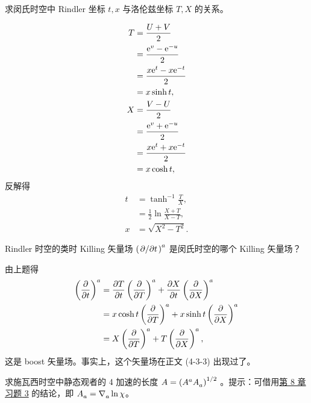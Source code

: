 \begin{xiti}
	\item 求闵氏时空中 Rindler 坐标 $t,x$ 与洛伦兹坐标 $T,X$ 的关系。

	\begin{jie}
		\begin{align*}
			T &= \frac{U+V}{2}\\
			&= \frac{\mathrm{e}^{v} - \mathrm{e}^{-u}}{2}\\
			&= \frac{x \mathrm{e}^{t} - x \mathrm{e}^{-t}}{2}\\
			&= x \sinh{t},\\
			X &= \frac{V - U}{2}\\
			&= \frac{\mathrm{e}^{v} + \mathrm{e}^{-u}}{2}\\
			&= \frac{x \mathrm{e}^{t} + x\mathrm{e}^{-t}}{2}\\
			&= x \cosh{t},
		\end{align*}
		反解得
		\begin{align*}
			t &= \tanh^{-1} \frac{T}{X},\\
			&= \frac{1}{2} \ln \frac{X + T}{X - T},\\
			x &= \sqrt{X^2 - T^2}.
		\end{align*}
	\end{jie}

	\item Rindler 时空的类时 Killing 矢量场 $\tensor{\left( \pdv*{t} \right)}{^a}$ 是闵氏时空的哪个 Killing 矢量场？

	\begin{jie}
		由上题得
		\begin{align*}
			\tensor{\left( \pdv{t} \right)}{^a} &= \pdv{T}{t} \tensor{\left( \pdv{T} \right)}{^a} + \pdv{X}{t} \tensor{\left( \pdv{X} \right)}{^a}\\
			&= x \cosh{t} \tensor{\left( \pdv{T} \right)}{^a} + x \sinh{t} \tensor{\left( \pdv{X} \right)}{^a}\\
			&= X \tensor{\left( \pdv{T} \right)}{^a} + T \tensor{\left( \pdv{X} \right)}{^a},
		\end{align*}
		这是 boost 矢量场。事实上，这个矢量场在正文 (4-3-3) 出现过了。
	\end{jie}

	\item 求施瓦西时空中静态观者的 4 加速的长度 $A = \left( \tensor{A}{^a} \tensor{A}{_a} \right)^{1/2}$ 。提示：可借用\hyperlink{prob-8.3}{第 8 章习题 3} 的结论，即 $\tensor{A}{_a} = \Nabla{a} \ln{\chi}$。


\end{xiti}
